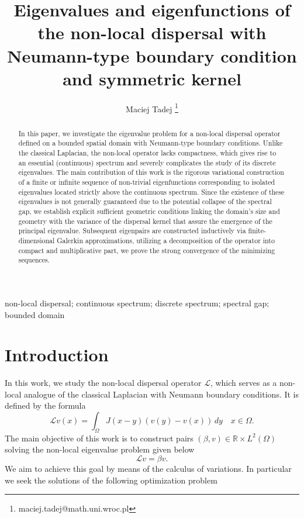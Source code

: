 \documentclass[12pt, a4paper]{article}
\title{Eigenvalues and eigenfunctions of the non-local dispersal with Neumann-type boundary condition and symmetric kernel}
\author[1]{Maciej Tadej \thanks{maciej.tadej@math.uni.wroc.pl}}
\affil[1]{\textit{Mathematical Institute, University of Wrocław, pl. Grunwaldzki 2, 50-384 Wrocław, Poland}}
\date{}
\theoremstyle{break}
\theoremstyle{break}
\theoremstyle{break}
\theoremstyle{break}
\theoremstyle{break}
\theoremstyle{break}
\theoremstyle{break}
\theoremstyle{break}
\theoremstyle{break}
\begin{document}
\maketitle

\hspace{20pt}

\begin{abstract}
    In this paper, we investigate the eigenvalue problem for a non-local dispersal operator defined on a bounded spatial domain with Neumann-type boundary conditions. Unlike the classical Laplacian, the non-local operator lacks compactness, which gives rise to an essential (continuous) spectrum and severely complicates the study of its discrete eigenvalues. The main contribution of this work is the rigorous variational construction of a finite or infinite sequence of non-trivial eigenfunctions corresponding to isolated eigenvalues located strictly above the continuous spectrum. Since the existence of these eigenvalues is not generally guaranteed due to the potential collapse of the spectral gap, we establish explicit sufficient geometric conditions linking the domain's size and geometry with the variance of the dispersal kernel that assure the emergence of the principal eigenvalue. Subsequent eigenpairs are constructed inductively via finite-dimensional Galerkin approximations, utilizing a decomposition of the operator into compact and multiplicative part, we prove the strong convergence of the minimizing sequences.
\end{abstract}

\begin{keywords}
    \: non-local dispersal; continuous spectrum; discrete spectrum; spectral gap; bounded domain
\end{keywords}

\newpage

\section{Introduction}

In this work, we study the non-local dispersal operator $\mathcal{L}$, which serves as a non-local analogue of the classical Laplacian with Neumann boundary conditions. It is defined by the formula
\begin{equation}
    \label{EQ:NonLocalNeumann}
    \mathcal{L}v(x) = \int_{\Omega} J(x-y) (v(y) - v(x)) \, dy \quad x \in \Omega.
\end{equation}
The main objective of this work is to construct pairs $(\beta, v) \in \mathbb{R}\times L^2(\Omega)$ solving the non-local eigenvalue problem given below
\begin{equation}
    \label{eq:nonlocal_eigenvalue_problem}
    \mathcal{L} v = \beta v.
\end{equation}
We aim to achieve this goal by means of the calculus of variations. In particular we seek the solutions of the following optimization problem
\end{document}
